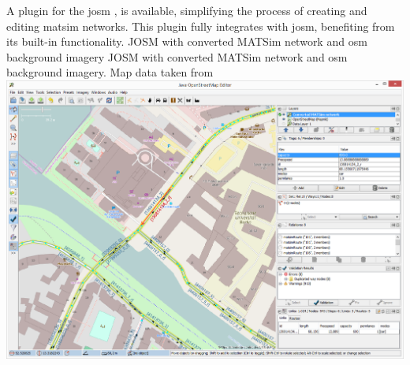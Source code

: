 A plugin for the \gls{josm} \citep[][]{JOSM2014}, is available, simplifying the process of creating and editing \gls{matsim} networks. This plugin fully integrates with \gls{josm}, benefiting from its built-in functionality.
%
\createfigure
{JOSM with converted MATSim network and \protect\gls{osm} background imagery}
{JOSM with converted MATSim network and \protect\gls{osm} background imagery. Map data taken from \citet[][]{OpenStreetMap2014}}
{\label{fig:networkeditor_screenshot}}
{\includegraphics[width=1.0\textwidth]{extending/figures/networkeditor/josm_screenshot}}
{}

